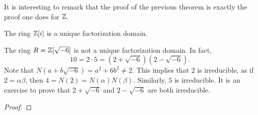 It is interesting to remark that the proof 
of the previous theorem is exactly the proof
one does for $\mathbb{Z}$. 

\begin{example}
	The ring $\mathbb{Z}[i]$ is a unique factorization domain. 	
\end{example}

\begin{example}
	The ring $R=\mathbb{Z}[\sqrt{-6}]$ is not a unique factorization domain. In fact,
	\[
	10=2\cdot 5=(2+\sqrt{-6})(2-\sqrt{-6}).
	\]	
	Note that $N(a+b\sqrt{-6})=a^2+6b^2\ne 2$. This implies that $2$ is irreducible, as 
	if $2=\alpha\beta$, then $4=N(2)=N(\alpha)N(\beta)$. 
	Similarly, $5$ is irreducible. It is an exercise to prove that 
	$2+\sqrt{-6}$ and $2-\sqrt{-6}$ are both irreducible. 
\end{example}

\begin{theorem}[Fermat]
	
\end{theorem}

\begin{proof}
	
\end{proof}
